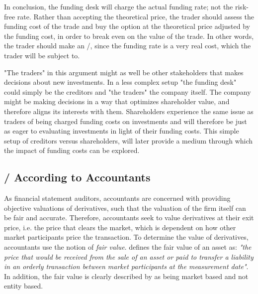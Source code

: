 \documentclass[main.tex]{subfiles}
\begin{document}
            In conclusion, the funding desk will charge the actual funding rate; not the risk-free rate.
            Rather than accepting the theoretical price, the trader should assess the funding cost of the trade 
            and buy the option at the theoretical price adjusted by the funding cost,
            in order to break even on the value of the trade.
            In other words, the trader should make an \FVA/, 
            since the funding rate is a very real cost, which the trader will be subject to.
            
            "The traders" in this argument might as well be other stakeholders that makes decisions about new investments.
            In a less complex setup "the funding desk" could simply be the creditors and "the traders" the company itself.
            The company might be making decisions in a way that optimizes shareholder value,
            and therefore aligns its interests with them.
            Shareholders experience the same issue as traders of being charged funding costs on investments 
            and will therefore be just as eager to evaluating investments in light of their funding costs.
            This simple setup of creditors versus shareholders, 
            will later provide a medium through which the impact of funding costs can be explored.

        \subsection{\FVA/ According to Accountants}
            As financial statement auditors, accountants are concerned with providing objective valuations of derivatives,
            such that the valuation of the firm itself can be fair and accurate.
            Therefore, accountants seek to value derivatives at their exit price, i.e. the price that clears the market,
            which is dependent on how other market participants price the transaction.
            To determine the value of derivatives, accountants use the notion of \textit{fair value}.
            \textcite{IFRS13} defines the fair value of an asset as: 
            \textit{"the price that would be received from the sale of an asset or paid to transfer a liability
            in an orderly transaction between market participants at the measurement date"}.
            In addition, the fair value is clearly described by \textcite{IFRS13} as being market based and not entity based.
\end{document}
